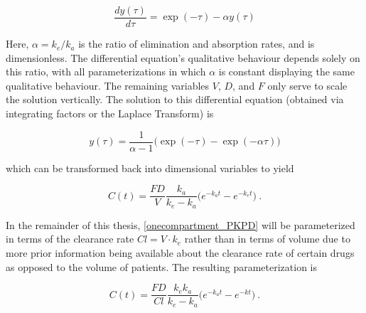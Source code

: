 \begin{equation}
	\dfrac{dy(\tau)}{d\tau} = \exp(-\tau) - \alpha y(\tau)
\end{equation}

\noindent Here, $\alpha = k_e / k_a$ is the ratio of elimination and absorption rates, and is dimensionless.  The differential equation's qualitative behaviour depends solely on this ratio, with all parameterizations in which $\alpha$ is constant displaying the same qualitative behaviour.  The remaining variables $V$, $D$, and $F$ only serve to scale the solution vertically.  The solution to this differential equation (obtained via integrating factors or the Laplace Transform) is

\begin{equation}\label{key}
	y(\tau) = \dfrac{1}{\alpha -1} \Big( \exp(-\tau) - \exp(-\alpha \tau) \Big)
\end{equation}

\noindent which can be transformed back into dimensional variables to yield

\begin{equation}\label{onecompartment_PKPD}
	C(t) = \dfrac{F D}{V}\dfrac{k_a}{k_e - k_a}\Big(e^{-k_at} - e^{-k_et}\Big) \>.
\end{equation}

In the remainder of this thesis, \cref{onecompartment_PKPD} will be parameterized in terms of the clearance rate $Cl = V \cdot k_e$ rather than in terms of volume due to more prior information being available about the clearance rate of certain drugs as opposed to the volume of patients.  The resulting parameterization is

\begin{equation}\label{onecompartment_PKPD_cl}
	C(t) = \dfrac{F D}{Cl}\dfrac{k_ek_a}{k_e - k_a}\Big(e^{-k_at} - e^{-kt}\Big) \>.
\end{equation}

